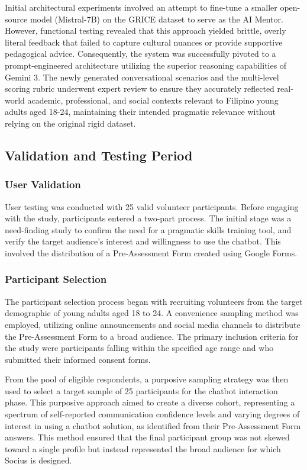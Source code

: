 Initial architectural experiments involved an attempt to fine-tune a smaller open-source model (Mistral-7B) on the GRICE dataset \mbox{\cite{zheng_grice_2021}} 
to serve as the AI Mentor. However, functional testing revealed that this approach yielded brittle, overly literal feedback that failed to capture cultural nuances or 
provide supportive pedagogical advice. Consequently, the system was successfully pivoted to a prompt-engineered architecture utilizing the superior reasoning capabilities 
of Gemini 3. The newly generated conversational scenarios and the multi-level scoring rubric underwent expert review to ensure they accurately reflected real-world academic, 
professional, and social contexts relevant to Filipino young adults aged 18-24, maintaining their intended pragmatic relevance without relying on the original rigid dataset.

\subsection{Validation and Testing Period}
\subsubsection{User Validation}
\indent User testing was conducted with 25 valid volunteer participants. Before engaging with the study, participants entered a two-part process. 
The initial stage was a need-finding study to confirm the need for a pragmatic skills training tool, and verify the target audience's interest and willingness to use the 
chatbot. This involved the distribution of a Pre-Assessment Form created using Google Forms.

\subsubsection{Participant Selection}
\indent The participant selection process began with recruiting volunteers from the target demographic of young adults aged 18 to 24. 
A convenience sampling method was employed, utilizing online announcements and social media channels to distribute the Pre-Assessment Form to a broad audience.
The primary inclusion criteria for the study were participants falling within the specified age range and who submitted their informed consent forms. 

From the pool of eligible respondents, a purposive sampling strategy was then used to select a target sample of 25 participants for the chatbot interaction 
phase. This purposive approach aimed to create a diverse cohort, representing a spectrum of self-reported communication confidence levels and varying degrees of interest in 
using a chatbot solution, as identified from their Pre-Assessment Form answers. This method ensured that the final participant group was not skewed toward a single profile but 
instead represented the broad audience for which Socius is designed.

